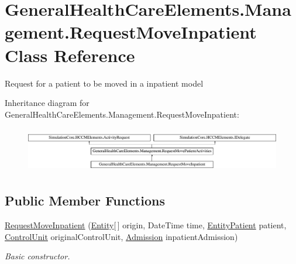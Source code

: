 \hypertarget{class_general_health_care_elements_1_1_management_1_1_request_move_inpatient}{}\section{General\+Health\+Care\+Elements.\+Management.\+Request\+Move\+Inpatient Class Reference}
\label{class_general_health_care_elements_1_1_management_1_1_request_move_inpatient}


Request for a patient to be moved in a inpatient model  


Inheritance diagram for General\+Health\+Care\+Elements.\+Management.\+Request\+Move\+Inpatient\+:\begin{figure}[H]
\begin{center}
\leavevmode
\includegraphics[height=1.981132cm]{class_general_health_care_elements_1_1_management_1_1_request_move_inpatient}
\end{center}
\end{figure}
\subsection*{Public Member Functions}
\begin{DoxyCompactItemize}
\item 
\hyperlink{class_general_health_care_elements_1_1_management_1_1_request_move_inpatient_a6d4ba6f0fe0bdc8a31db692e0e148403}{Request\+Move\+Inpatient} (\hyperlink{class_simulation_core_1_1_h_c_c_m_elements_1_1_entity}{Entity}\mbox{[}$\,$\mbox{]} origin, Date\+Time time, \hyperlink{class_general_health_care_elements_1_1_entities_1_1_entity_patient}{Entity\+Patient} patient, \hyperlink{class_simulation_core_1_1_h_c_c_m_elements_1_1_control_unit}{Control\+Unit} original\+Control\+Unit, \hyperlink{class_general_health_care_elements_1_1_treatment_admission_types_1_1_admission}{Admission} inpatient\+Admission)
\begin{DoxyCompactList}\small\item\em Basic constructor. \end{DoxyCompactList}\end{DoxyCompactItemize}
